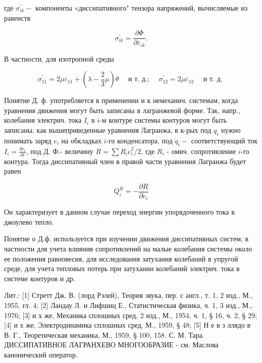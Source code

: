 \documentclass[10pt]{article}
\begin{document}
где $\sigma_{i k}^{\prime}-$ компоненты «диссипативного" тензора напряжений, вычисляемые из равенств



\[

\sigma_{i k}^{\prime}=\frac{\partial \Phi}{\partial \varepsilon_{i k}} .

\]



В частности, для изотропной среды



\[

\sigma_{11}^{\prime}=2 \mu \varepsilon_{11}+\left(\lambda-\frac{2}{3} \mu\right) \theta \quad \text { и т. д.; } \quad \sigma_{12}^{\prime}=2 \mu \varepsilon_{12} \quad \text { и т. д. }

\]



Понятие Д. ф. употребляется в применении и к немеханич. системам, когда уравнения движения могут быть записаны в лагранжевой форме. Так, напр., колебания электрич. тока $I_{i}$ в $i$-м контуре системы контуров могут быть записаны, как вышеприведенные уравнения Лагранжа, в к-рых под $q_{i}$ нужно понимать заряд $e_{i}$ на обкладках $i$-го конденсатора, под $\dot{q}_{i}-$ соответствующий ток $I_{i}=\frac{\partial e_{i}}{d t}$, под Д. Ф.- величину $R=\sum R_{i} \dot{e}_{i}^{2} / 2$, где $R_{i}$ - омич. сопротивление $i$-го контура. Тогда диссипативный член в правой части уравнения Лагранжа будет равен



\[

Q_{i}^{R}=-\frac{\partial R}{\partial \dot{e}_{i}}

\]



Он характеризует в данном случае переход энергии упорядоченного тока в джоулево тепло.



Понятие о Д.ф. используется при изучении движения диссипативных систем, в частности для учета влияния сопротивлений на малые колебания системы около ее положения равновесия, для исследования затухания колебаний в упругой среде, для учета тепловых потерь при затухании колебаний электрич. тока в системе контуров и др.



Лит.: [1] Стретт Дж. В. (лорд Рэлей), Теория звука, пер. с англ., т. 1, 2 изд., М., 1955, гл. 4; [2] Ландау Л. и Лифшиц Е., Статистическая физика, ч. 1, 3 изд., М., 1976; [3] и х же, Механика сплошных сред, 2 изд., М., 1954, ч. 1, § 16, ч. 2, § 29; [4] и х же, Электродинамика сплошных сред, М., 1959, § 48; [5] Н е в з ллядо в В. Г., Теоретическая механика, М., 1959, § 100, 158. С. М. Тара. ДИССИПАТИВНОЕ ЛАГРАНХЕВО МНОГООБРАЗИЕ - см. Маслова канонический оператор.
\end{document}
